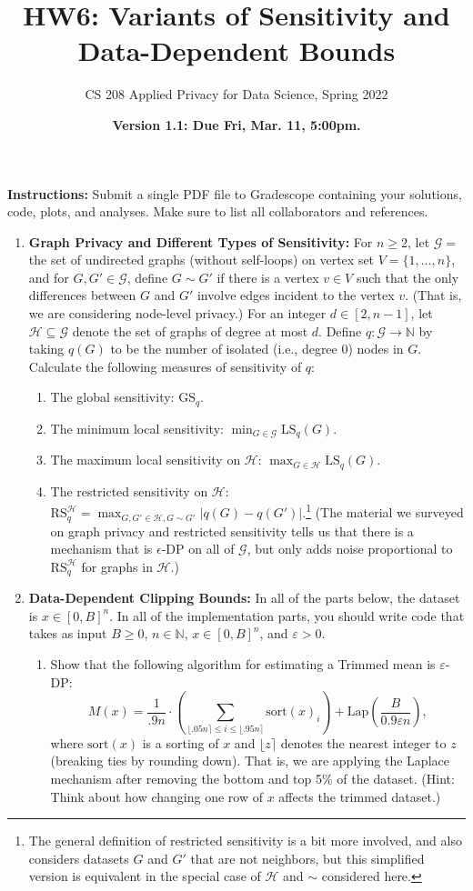 \documentclass[11pt]{article}
\title{\vspace{-1.5cm} HW6: Variants of Sensitivity and Data-Dependent Bounds}
\author{CS 208 Applied Privacy for Data Science, Spring 2022}
\date{\textbf{Version 1.1: Due Fri, Mar. 11, 5:00pm.}}
\newcommand{\instructions}{\noindent \textbf{Instructions:} Submit a single PDF file to Gradescope containing your solutions, code, plots, and analyses. Make sure to list all collaborators and references.}
\theoremstyle{plain}
\theoremstyle{definition}
\theoremstyle{solution}
\newcommand{\N}{\mathbb{N}}
\newcommand{\eps}{\epsilon}
\newcommand{\cH}{\mathcal{H}}
\newcommand{\cG}{\mathcal{G}}
\newcommand{\GS}{\mathrm{GS}}
\newcommand{\LS}{\mathrm{LS}}
\newcommand{\RS}{\mathrm{RS}}
\newcommand{\sort}{\mathrm{sort}}
\begin{document}
\maketitle

\instructions

\begin{enumerate}[leftmargin=*]

\item \textbf{Graph Privacy and Different Types of Sensitivity:} 
For $n\geq 2$, let $\cG = $ the set of undirected graphs (without self-loops) on vertex set $V=\{1,\ldots,n\}$, and for $G,G'\in \cG$, define $G\sim G'$ if there is a vertex $v\in V$ such that the only differences between $G$ and $G'$ involve edges incident to the vertex $v$.  (That is, we are considering node-level privacy.)
For an integer $d\in [2,n-1]$, let $\cH \subseteq \cG$ denote the set of graphs of degree at most $d$.
Define $q : \cG \rightarrow \N$ by taking $q(G)$ to be the number of isolated (i.e., degree $0$) nodes in $G$.
Calculate the following measures of sensitivity of $q$:
\begin{enumerate}
    \item The global sensitivity: $\GS_q$.
    \item The minimum local sensitivity: $\min_{G\in \cG} \LS_q(G)$.
    \item The maximum local sensitivity on $\cH$: $\max_{G\in \cH} \LS_q(G)$.
    \item The restricted sensitivity on $\cH$: $\RS_q^{\cH} = \max_{G,G'\in \cH, G\sim G'} |q(G)-q(G')|$.\footnote{The general definition of restricted sensitivity is a bit more involved, and also considers datasets $G$ and $G'$ that are not neighbors, but this simplified version is equivalent in the special case of $\cH$ and $\sim$ considered here.}
    (The material we surveyed on graph privacy and restricted sensitivity tells us that there is a mechanism that is $\eps$-DP on all of $\cG$, but only adds noise proportional to $\RS_q^{\cH}$ for graphs in $\cH$.)
\end{enumerate}

\item \textbf{Data-Dependent Clipping Bounds:} In all of the parts below, the dataset is $x\in [0,B]^n$.   In all of the implementation parts, you should write
code that takes as input $B\geq 0$, $n\in\mathbb{N}$, $x\in [0,B]^n$, and $\varepsilon>0$.

\begin{enumerate}
\item Show that the following algorithm for estimating a Trimmed mean is $\varepsilon$-DP:
$$M(x) = \frac{1}{.9n}\cdot \left(\sum_{\lfloor .05n \rceil\leq i \leq \lfloor .95n \rceil} \sort(x)_i\right) +\mathrm{Lap}\left(\frac{B}{0.9\varepsilon n}\right),$$
where $\sort(x)$ is a sorting of $x$ and $\lfloor z\rceil$ denotes the nearest integer to $z$ (breaking ties by rounding down).  That is, we are applying the Laplace mechanism after removing the bottom and top 5\% of the dataset.
(Hint: Think about how changing one row of $x$ affects the trimmed dataset.)
\label{part:TrimLap}


\end{enumerate}
\end{enumerate}
\end{document}
